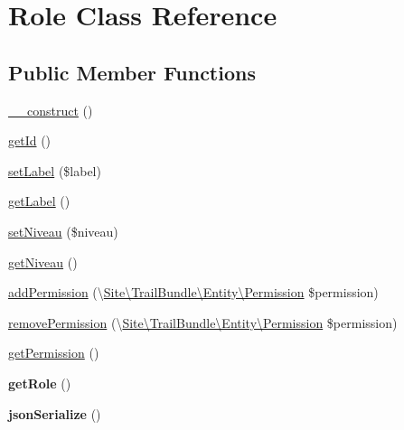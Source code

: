 \hypertarget{class_site_1_1_trail_bundle_1_1_entity_1_1_role}{}\section{Role Class Reference}
\label{class_site_1_1_trail_bundle_1_1_entity_1_1_role}
\subsection*{Public Member Functions}
\begin{DoxyCompactItemize}
\item 
\hyperlink{class_site_1_1_trail_bundle_1_1_entity_1_1_role_a095c5d389db211932136b53f25f39685}{\+\_\+\+\_\+construct} ()
\item 
\hyperlink{class_site_1_1_trail_bundle_1_1_entity_1_1_role_a12251d0c022e9e21c137a105ff683f13}{get\+Id} ()
\item 
\hyperlink{class_site_1_1_trail_bundle_1_1_entity_1_1_role_aff9dc1c7a22e2b4168647651480e586a}{set\+Label} (\$label)
\item 
\hyperlink{class_site_1_1_trail_bundle_1_1_entity_1_1_role_a14c4e7420d903d3e40342266333d2ecf}{get\+Label} ()
\item 
\hyperlink{class_site_1_1_trail_bundle_1_1_entity_1_1_role_a5214eaa56368d2a075a50b35c4ca2007}{set\+Niveau} (\$niveau)
\item 
\hyperlink{class_site_1_1_trail_bundle_1_1_entity_1_1_role_a8c3b878183b2872537f0bfb1d6f7a09d}{get\+Niveau} ()
\item 
\hyperlink{class_site_1_1_trail_bundle_1_1_entity_1_1_role_a2545fa30df44e9d68f5a4e1c78b20bcf}{add\+Permission} (\textbackslash{}\hyperlink{class_site_1_1_trail_bundle_1_1_entity_1_1_permission}{Site\textbackslash{}\+Trail\+Bundle\textbackslash{}\+Entity\textbackslash{}\+Permission} \$permission)
\item 
\hyperlink{class_site_1_1_trail_bundle_1_1_entity_1_1_role_a2c0d029d6d313765ea01d5519d0edac1}{remove\+Permission} (\textbackslash{}\hyperlink{class_site_1_1_trail_bundle_1_1_entity_1_1_permission}{Site\textbackslash{}\+Trail\+Bundle\textbackslash{}\+Entity\textbackslash{}\+Permission} \$permission)
\item 
\hyperlink{class_site_1_1_trail_bundle_1_1_entity_1_1_role_a478067ecf173884c2ee3e5b94e746200}{get\+Permission} ()
\item 
\hypertarget{class_site_1_1_trail_bundle_1_1_entity_1_1_role_a0b2e7098f1c48a7439a42bada5b69689}{}{\bfseries get\+Role} ()\label{class_site_1_1_trail_bundle_1_1_entity_1_1_role_a0b2e7098f1c48a7439a42bada5b69689}

\item 
\hypertarget{class_site_1_1_trail_bundle_1_1_entity_1_1_role_ad402d8679325bc514874370f02b5c2ac}{}{\bfseries json\+Serialize} ()\label{class_site_1_1_trail_bundle_1_1_entity_1_1_role_ad402d8679325bc514874370f02b5c2ac}

\end{DoxyCompactItemize}


